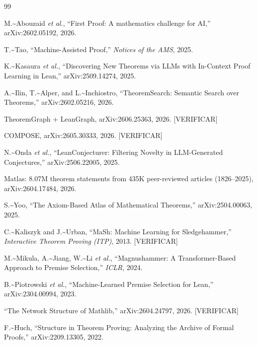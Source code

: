 \documentclass[12pt,a4paper]{article}
\theoremstyle{remark}
\begin{document}
\begin{thebibliography}{99}

M.\textasciitilde{}Abouzaid \emph{et al.}, ``First Proof: A mathematics challenge for AI,''
arXiv:2602.05192, 2026.

T.\textasciitilde{}Tao, ``Machine-Assisted Proof,''
\emph{Notices of the AMS}, 2025.

K.\textasciitilde{}Kasaura \emph{et al.}, ``Discovering New Theorems via LLMs with In-Context Proof Learning in Lean,''
arXiv:2509.14274, 2025.

A.\textasciitilde{}Ilin, T.\textasciitilde{}Alper, and L.\textasciitilde{}Inchiostro, ``TheoremSearch: Semantic Search over Theorems,''
arXiv:2602.05216, 2026.

TheoremGraph + LeanGraph, arXiv:2606.25363, 2026. {[}VERIFICAR{]}

COMPOSE, arXiv:2605.30333, 2026. {[}VERIFICAR{]}

N.\textasciitilde{}Onda \emph{et al.}, ``LeanConjecturer: Filtering Novelty in LLM-Generated Conjectures,''
arXiv:2506.22005, 2025.

Matlas: 8.07M theorem statements from 435K peer-reviewed articles (1826--2025),
arXiv:2604.17484, 2026.

S.\textasciitilde{}Yoo, ``The Axiom-Based Atlas of Mathematical Theorems,''
arXiv:2504.00063, 2025.

C.\textasciitilde{}Kaliszyk and J.\textasciitilde{}Urban, ``MaSh: Machine Learning for Sledgehammer,''
\emph{Interactive Theorem Proving (ITP)}, 2013. {[}VERIFICAR{]}

M.\textasciitilde{}Mikula, A.\textasciitilde{}Jiang, W.\textasciitilde{}Li \emph{et al.}, ``Magnushammer: A Transformer-Based Approach to Premise Selection,''
\emph{ICLR}, 2024.

B.\textasciitilde{}Piotrowski \emph{et al.}, ``Machine-Learned Premise Selection for Lean,''
arXiv:2304.00994, 2023.

``The Network Structure of Mathlib,''
arXiv:2604.24797, 2026. {[}VERIFICAR{]}

F.\textasciitilde{}Huch, ``Structure in Theorem Proving: Analyzing the Archive of Formal Proofs,''
arXiv:2209.13305, 2022.


\end{thebibliography}
\end{document}
